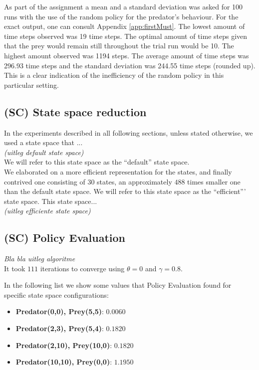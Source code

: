 \documentclass{article}
\begin{document}
As part of the assignment a mean and a standard deviation was asked for 100 runs with the use of the random policy for the predator's behaviour. For the exact output, one can consult Appendix \ref{app:firstMust}. The lowest amount of time steps observed was 19 time steps. The optimal amount of time steps given that the prey would remain still throughout the trial run would be 10. The highest amount observed was 1194 steps. The average amount of time steps was 296.93 time steps and the standard deviation was 244.55 time steps (rounded up). This is a clear indication of the inefficiency of the random policy in this particular setting. 

\subsection{(SC) State space reduction}
In the experiments described in all following sections, unless stated otherwise, we used a state space that ...\\
\emph{ (uitleg default state space)}\\
We will refer to this state space as the ``default'' state space.\\

We elaborated on a more efficient representation for the states, and finally contrived one consisting of $30$ states, an approximately $488$ times smaller one than the default state space.  We will refer to this state space as the ``efficient''' state space. This state space... \\
\emph{(uitleg efficiente state space)}

\subsection{(SC) Policy Evaluation}
\emph{Bla bla uitleg algoritme}\\

It took $111$ iterations to converge using $\theta = 0$ and $\gamma = 0.8$.

In the following list we show some values that Policy Evaluation found for specific state space configurations:
\begin{itemize}\label{list:policyEvaluationListValues}
\item{\textbf{Predator(0,0), Prey(5,5)}}: $0.0060$		
\item{\textbf{Predator(2,3), Prey(5,4)}}: $0.1820$
\item{\textbf{Predator(2,10), Prey(10,0)}}: $0.1820$
\item{\textbf{Predator(10,10), Prey(0,0)}}: $1.1950$
\end{itemize}
\end{document}
